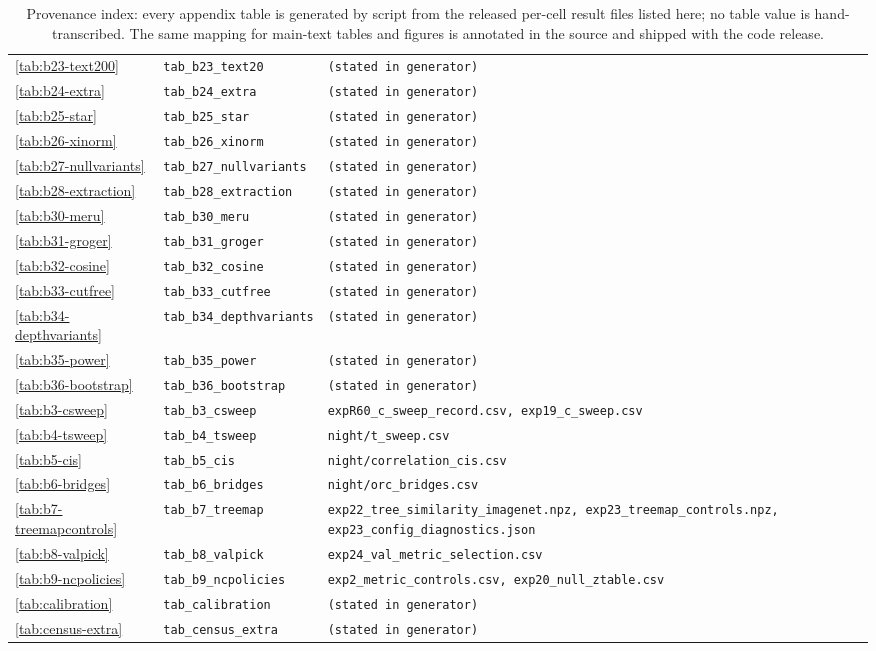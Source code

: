 \begin{table}[H]
\begin{tabular}{lll}
\ref{tab:b23-text200} & \texttt{tab\_b23\_text20} & \texttt{(stated in generator)} \\
\ref{tab:b24-extra} & \texttt{tab\_b24\_extra} & \texttt{(stated in generator)} \\
\ref{tab:b25-star} & \texttt{tab\_b25\_star} & \texttt{(stated in generator)} \\
\ref{tab:b26-xinorm} & \texttt{tab\_b26\_xinorm} & \texttt{(stated in generator)} \\
\ref{tab:b27-nullvariants} & \texttt{tab\_b27\_nullvariants} & \texttt{(stated in generator)} \\
\ref{tab:b28-extraction} & \texttt{tab\_b28\_extraction} & \texttt{(stated in generator)} \\
\ref{tab:b30-meru} & \texttt{tab\_b30\_meru} & \texttt{(stated in generator)} \\
\ref{tab:b31-groger} & \texttt{tab\_b31\_groger} & \texttt{(stated in generator)} \\
\ref{tab:b32-cosine} & \texttt{tab\_b32\_cosine} & \texttt{(stated in generator)} \\
\ref{tab:b33-cutfree} & \texttt{tab\_b33\_cutfree} & \texttt{(stated in generator)} \\
\ref{tab:b34-depthvariants} & \texttt{tab\_b34\_depthvariants} & \texttt{(stated in generator)} \\
\ref{tab:b35-power} & \texttt{tab\_b35\_power} & \texttt{(stated in generator)} \\
\ref{tab:b36-bootstrap} & \texttt{tab\_b36\_bootstrap} & \texttt{(stated in generator)} \\
\ref{tab:b3-csweep} & \texttt{tab\_b3\_csweep} & \texttt{expR60\_c\_sweep\_record.csv, exp19\_c\_sweep.csv} \\
\ref{tab:b4-tsweep} & \texttt{tab\_b4\_tsweep} & \texttt{night/t\_sweep.csv} \\
\ref{tab:b5-cis} & \texttt{tab\_b5\_cis} & \texttt{night/correlation\_cis.csv} \\
\ref{tab:b6-bridges} & \texttt{tab\_b6\_bridges} & \texttt{night/orc\_bridges.csv} \\
\ref{tab:b7-treemapcontrols} & \texttt{tab\_b7\_treemap} & \texttt{exp22\_tree\_similarity\_imagenet.npz, exp23\_treemap\_controls.npz, exp23\_config\_diagnostics.json} \\
\ref{tab:b8-valpick} & \texttt{tab\_b8\_valpick} & \texttt{exp24\_val\_metric\_selection.csv} \\
\ref{tab:b9-ncpolicies} & \texttt{tab\_b9\_ncpolicies} & \texttt{exp2\_metric\_controls.csv, exp20\_null\_ztable.csv} \\
\ref{tab:calibration} & \texttt{tab\_calibration} & \texttt{(stated in generator)} \\
\ref{tab:census-extra} & \texttt{tab\_census\_extra} & \texttt{(stated in generator)} \\
\bottomrule
\end{tabular}
\caption{Provenance index: every appendix table is generated by script from the released per-cell result files listed here; no table value is hand-transcribed. The same mapping for main-text tables and figures is annotated in the source and shipped with the code release.}
\label{tab:provenance}
\end{table}
